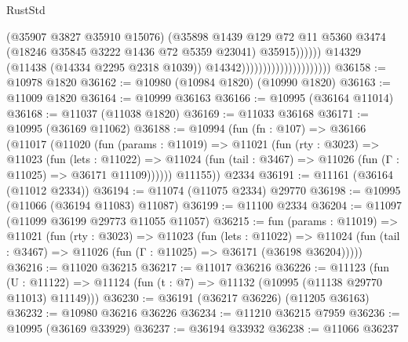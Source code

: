 \begin{lexlean}{RustStd}
\begin{coremodule}
                                                        (@35907 @3827 @35910 @15076)
                                                        (@35898
                                                          @1439
                                                          @129
                                                          @72
                                                          @11
                                                          @5360
                                                          @3474
                                                          (@18246
                                                            @35845
                                                            @3222
                                                            @1436
                                                            @72
                                                            @5359
                                                            @23041)
                                                          @35915))))))
                                              @14329
                                              (@11438 (@14334 @2295 @2318 @1039))
                                              @14342)))))))))))))))))))))
@36158 := @10978 @1820
@36162 := @10980 (@10984 @1820) (@10990 @1820)
@36163 := @11009 @1820
@36164 := @10999 @36163
@36166 := @10995 (@36164 @11014)
@36168 := @11037 (@11038 @1820)
@36169 := @11033 @36168
@36171 := @10995 (@36169 @11062)
@36188 := @10994
    (fun (fn : @107) =>
    @36166
      (@11017
        (@11020
          (fun (params : @11019) =>
          @11021
            (fun (rty : @3023) =>
            @11023
              (fun (lets : @11022) =>
              @11024 (fun (tail : @3467) => @11026 (fun (Γ : @11025) => @36171 @11109))))))
        @11155))
    @2334
@36191 := @11161 (@36164 (@11012 @2334))
@36194 := @11074 (@11075 @2334) @29770
@36198 := @10995 (@11066 (@36194 @11083) @11087)
@36199 := @11100 @2334
@36204 := @11097 (@11099 @36199 @29773 @11055 @11057)
@36215 := fun (params : @11019) =>
  @11021
    (fun (rty : @3023) =>
    @11023
      (fun (lets : @11022) =>
      @11024 (fun (tail : @3467) => @11026 (fun (Γ : @11025) => @36171 (@36198 @36204)))))
@36216 := @11020 @36215
@36217 := @11017 @36216
@36226 := @11123
    (fun (U : @11122) => @11124 (fun (t : @7) => @11132 (@10995 (@11138 @29770 @11013) @11149)))
@36230 := @36191 (@36217 @36226) (@11205 @36163)
@36232 := @10980 @36216 @36226
@36234 := @11210 @36215 @7959
@36236 := @10995 (@36169 @33929)
@36237 := @36194 @33932
@36238 := @11066 @36237

\end{coremodule}
\end{lexlean}
